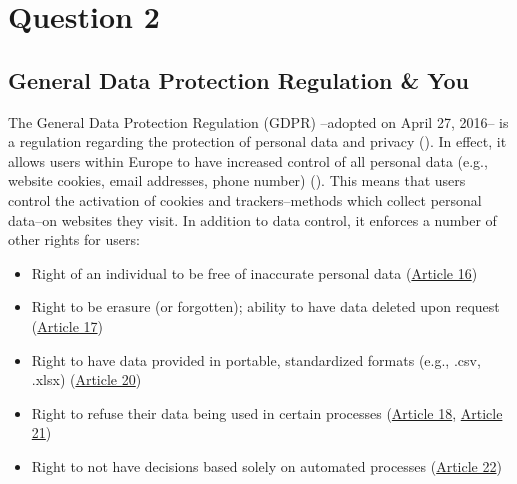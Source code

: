 \documentclass[
	letterpaper, %
]{jdf}
\begin{document}
\section{Question 2}
\subsection{General Data Protection Regulation \& You}
The General Data Protection Regulation (GDPR) --adopted on April 27, 2016-- is a regulation regarding the protection of personal data and privacy (\cite{gdpr}). In effect, it allows users within Europe to have increased control of all personal data (e.g., website cookies, email addresses, phone number) (\cite{EUdataregulations}). This means that users control the activation of cookies and trackers--methods which collect personal data--on websites they visit. In addition to data control, it enforces a number of other rights for users:
\begin{itemize}
	\item Right of an individual to be free of inaccurate personal data (\href{https://gdpr-info.eu/art-16-gdpr/}{Article 16})
	\item Right to be erasure (or forgotten); ability to have data deleted upon request (\href{https://gdpr-info.eu/art-17-gdpr/}{Article 17})
	\item Right to have data provided in portable, standardized formats (e.g., .csv, .xlsx) (\href{https://gdpr-info.eu/art-20-gdpr/}{Article 20})
	\item Right to refuse their data being used in certain processes (\href{https://gdpr-info.eu/art-18-gdpr/}{Article 18}, \href{https://gdpr-info.eu/art-21-gdpr/}{Article 21})
	\item Right to not have decisions based solely on automated processes (\href{https://gdpr-info.eu/art-22-gdpr/}{Article 22})
\end{itemize}
\end{document}
